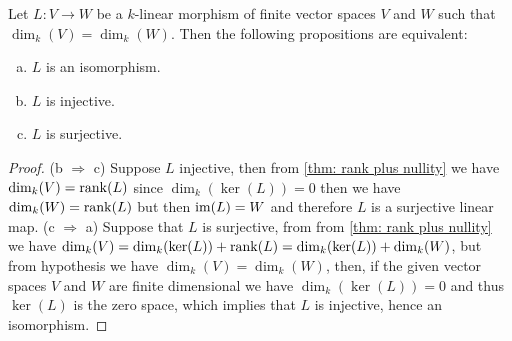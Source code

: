 \begin{corollary}\label{cor: equal dim - iso conditions}
Let \(L : V \to W\) be a \(k\)-linear morphism of finite vector spaces \(V\)
and \(W\) such that \(\dim_k(V) = \dim_k(W)\). Then the following propositions
are equivalent:
\begin{enumerate}[(a).]
  \item \(L\) is an isomorphism.
  \item \(L\) is injective.
  \item \(L\) is surjective.
\end{enumerate}
\end{corollary}

\begin{proof}
(b \(\Rightarrow\) c) Suppose \(L\) injective, then from \cref{thm: rank plus
nullity} we have \(\dim_k(V) = \operatorname{rank}(L)\) since \(\dim_k(\ker(L)) = 0\) then
we have \(\dim_k(W) = \operatorname{rank}(L)\) but then \(\operatorname{im}(L) = W\) and therefore \(L\)
is a surjective linear map. (c \(\Rightarrow\) a) Suppose that \(L\) is
surjective, from from \cref{thm: rank plus nullity} we have \(\dim_k(V) =
\dim_k(\ker(L)) + \operatorname{rank}(L) = \dim_k(\ker(L)) + \dim_k(W)\), but from
hypothesis we have \(\dim_k(V) = \dim_k(W)\), then, if the given vector spaces
\(V\) and \(W\) are finite dimensional we have \(\dim_k(\ker(L)) = 0\) and
thus \(\ker(L)\) is the zero space, which implies that \(L\) is injective,
hence an isomorphism.
\end{proof}
